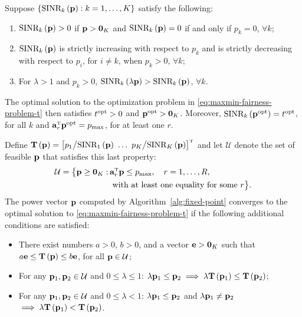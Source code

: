 \begin{lemma}\label{lemma:fixed-point}
Suppose $\left\{\textrm{SINR}_k\left(\mathbf{p}\right):k=1,\ldots,K\right\}$ satisfy the following:
\begin{enumerate}	
   \item $\textrm{SINR}_k\left(\mathbf{p}\right)>0$ if $\mathbf{p}>\mathbf{0}_K$ and $\textrm{SINR}_k\left(\mathbf{p}\right)=0$ if and only if $p_k=0$, $\forall k$;
   \item $\textrm{SINR}_k\left(\mathbf{p}\right)$ is strictly increasing with respect to $p_k$ and is strictly decreasing with respect to $p_i$, for $i\neq k$, when $p_k>0$, $\forall k$;
  \item For $\lambda > 1$ and $p_k > 0$, $\textrm{SINR}_k\left(\lambda\mathbf{p}\right)>\textrm{SINR}_k\left(\mathbf{p}\right)$, $\forall k$. 
  \end{enumerate}
The optimal solution to the optimization problem in \eqref{eq:maxmin-fairness-problem-t} then satisfies $t^{\rm opt}>0$ and $\mathbf{p}^{\rm opt}>\mathbf{0}_K$. Moreover, $\textrm{SINR}_k\left(\mathbf{p}^{\rm opt}\right)=t^{\rm opt}$, for all $k$ and $\vect{a}_r^{\Ttran}\vect{p}^{\rm opt}= p_{\textrm{max}}$, for at least one $r$. 

Define $\vect{T}\left(\vect{p}\right)=\left[ p_1\big/\textrm{SINR}_1\left(\vect{p}\right) \ \ldots \  p_K\big/\textrm{SINR}_K\left(\vect{p}\right) \right]^{\Ttran}$ and let $\mathcal{U}$ denote the set of feasible $\mathbf{p}$ that satisfies this last property:
\begin{align}
\mathcal{U}=\big\{\vect{p}\geq \vect{0}_K: \, & \vect{a}_r^{\Ttran}\vect{p}\leq p_{\textrm{max}}, \quad r=1,\ldots,R, \nonumber \\ 
&\text{ with at least one equality for some }r \big\}.
\end{align} 
The power vector $\mathbf{p}$ computed by Algorithm~\ref{alg:fixed-point} converges to the optimal solution to \eqref{eq:maxmin-fairness-problem-t} if the following additional conditions are satisfied:
\begin{itemize}
\item  There exist numbers $a > 0$, $b > 0$, and a vector $\mathbf{e} > \mathbf{0}_K$ such that $a\mathbf{e} \leq \mathbf{T}\left(\mathbf{p}\right) \leq b\mathbf{e}$, for all $\mathbf{p}\in \mathcal{U}$;
\item For any $\mathbf{p}_1, \mathbf{p}_2 \in \mathcal{U}$ and $0\leq \lambda \leq 1$: $\lambda\mathbf{p}_1\leq \mathbf{p}_2 \implies \lambda\mathbf{T}\left(\mathbf{p}_1\right)\leq \mathbf{T}\left(\mathbf{p}_2\right)$;
\item For any $\mathbf{p}_1, \mathbf{p}_2 \in \mathcal{U}$ and $0\leq \lambda < 1$:  $\lambda\mathbf{p}_1\leq \mathbf{p}_2$ and $\lambda\mathbf{p}_1\neq \mathbf{p}_2$  $\implies \lambda\mathbf{T}\left(\mathbf{p}_1\right)< \mathbf{T}\left(\mathbf{p}_2\right)$.
\end{itemize}
\end{lemma}


